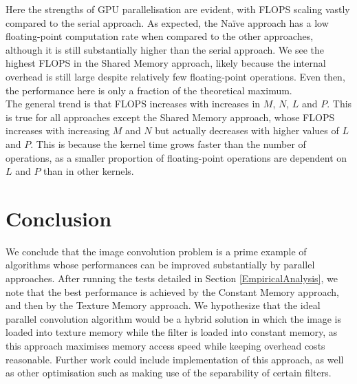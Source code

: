 \documentclass[10pt]{article}
\begin{document}
Here the strengths of GPU parallelisation are evident, with FLOPS scaling vastly compared to the serial approach. As expected, the Na\"{i}ve approach has a low floating-point computation rate when compared to the other approaches, although it is still substantially higher than the serial approach. We see the highest FLOPS in the Shared Memory approach, likely because the internal overhead is still large despite relatively few floating-point operations. Even then, the performance here is only a fraction of the theoretical maximum.
\\
The general trend is that FLOPS increases with increases in $M$, $N$, $L$ and $P$. This is true for all approaches except the Shared Memory approach, whose FLOPS increases with increasing $M$ and $N$ but actually decreases with higher values of $L$ and $P$. This is because the kernel time grows faster than the number of operations, as a smaller proportion of floating-point operations are dependent on $L$ and $P$ than in other kernels.
\section{Conclusion}
We conclude that the image convolution problem is a prime example of algorithms whose performances can be improved substantially by parallel approaches. After running the tests detailed in Section \ref{EmpiricalAnalysis}, we note that the best performance is achieved by the Constant Memory approach, and then by the Texture Memory approach. We hypothesize that the ideal parallel convolution algorithm would be a hybrid solution in which the image is loaded into texture memory while the filter is loaded into constant memory, as this approach maximises memory access speed while keeping overhead costs reasonable. Further work could include implementation of this approach, as well as other optimisation such as making use of the separability of certain filters.


\end{document}
